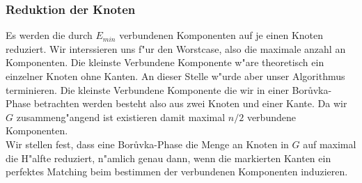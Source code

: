 \subsubsection{Reduktion der Knoten}
Es werden die durch $E_{min}$ verbundenen Komponenten auf je einen Knoten 
    reduziert.
    Wir interssieren uns f"ur den Worstcase, also die maximale anzahl an 
    Komponenten.
    Die kleinste Verbundene Komponente w"are theoretisch ein
    einzelner Knoten ohne Kanten.
    An dieser Stelle w"urde aber unser Algorithmus terminieren.
    Die kleinste Verbundene Komponente die wir in einer Bor\r uvka-Phase 
    betrachten werden besteht also aus zwei Knoten und einer Kante.
    Da wir $G$ zusammeng"angend ist existieren damit maximal $n/2$ verbundene
    Komponenten.\\
Wir stellen fest, dass eine Bor\r uvka-Phase die Menge an Knoten in $G$ auf 
    maximal die H"alfte reduziert, n"amlich genau dann, wenn die markierten 
    Kanten ein perfektes Matching beim bestimmen der verbundenen Komponenten
    induzieren.\\
